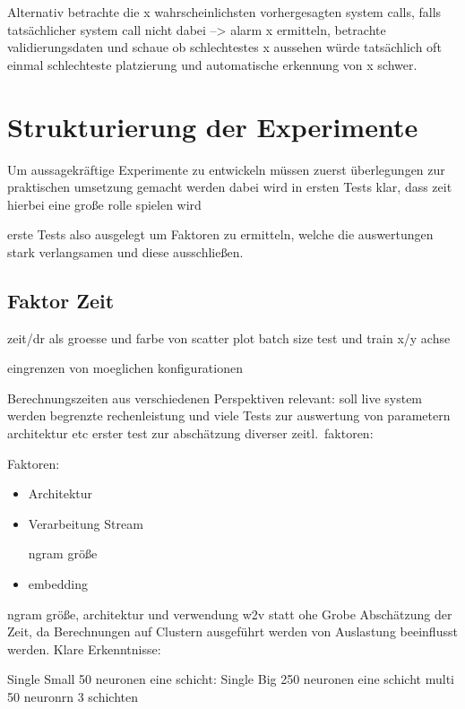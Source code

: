         Alternativ betrachte die x wahrscheinlichsten vorhergesagten system calls, falls tatsächlicher system call nicht dabei --> alarm
        x ermitteln, betrachte validierungsdaten und schaue ob schlechtestes x aussehen würde
        tatsächlich oft einmal schlechteste platzierung und automatische erkennung von x schwer.

\section{Strukturierung der Experimente}
    Um aussagekräftige Experimente zu entwickeln müssen zuerst 
    überlegungen zur praktischen umsetzung gemacht werden
    dabei wird in ersten Tests klar, dass zeit hierbei eine große rolle spielen wird

    erste Tests also ausgelegt um Faktoren zu ermitteln, welche die auswertungen stark verlangsamen
    und diese ausschließen.

    \subsection{Faktor Zeit}

        zeit/dr als groesse und farbe von scatter plot
        batch size test und train x/y achse

        eingrenzen von moeglichen konfigurationen

        Berechnungszeiten aus verschiedenen Perspektiven relevant:
        soll live system werden
        begrenzte rechenleistung und viele Tests zur auswertung von parametern architektur etc
        erster test zur abschätzung diverser zeitl.\ faktoren:

        Faktoren:
        \begin{itemize}
            \item Architektur
            \item Verarbeitung Stream

                 ngram größe
            \item embedding
        \end{itemize}

        ngram größe, architektur und verwendung w2v statt ohe
        Grobe Abschätzung der Zeit, da Berechnungen auf Clustern ausgeführt werden von Auslastung beeinflusst werden.
        Klare Erkenntnisse:

            Single Small 50 neuronen eine schicht:
            Single Big 250 neuronen eine schicht
            multi 50 neuronrn 3 schichten

